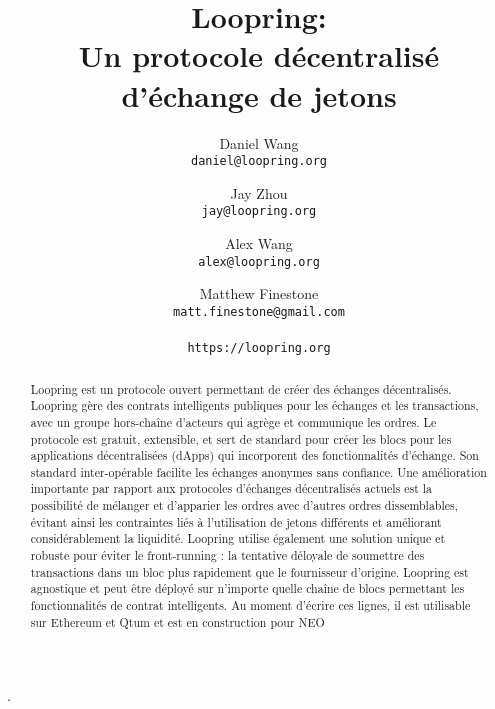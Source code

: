 \documentclass[UTF8,nofonts]{article}
\title{\textbf{Loopring:}\\\textbf{Un protocole décentralisé d'échange de jetons}}
\author{
  Daniel Wang\\
  \texttt{daniel@loopring.org}\\
  \and
  	Jay Zhou\\
  	\texttt{jay@loopring.org}\\
  	\and
  	Alex Wang\\
  	\texttt{alex@loopring.org}\\
  	\and
  	Matthew Finestone\\
  	\texttt{matt.finestone@gmail.com}\\ 
  \\
  \texttt{https://loopring.org}
 }
\begin{document}
\maketitle

\begin{abstract}
Loopring est un protocole ouvert permettant de créer des échanges décentralisés. Loopring gère des contrats intelligents publiques  pour les échanges et les transactions, avec un groupe hors-chaîne d’acteurs qui agrège et communique les ordres. Le protocole est gratuit, extensible, et sert de standard pour créer les blocs pour les applications décentralisées (dApps) qui incorporent des fonctionnalités d’échange. Son standard inter-opérable facilite les échanges anonymes sans confiance. Une amélioration importante par rapport aux protocoles d'échanges décentralisés actuels est la possibilité de mélanger et d'apparier les ordres avec d'autres ordres dissemblables, évitant ainsi les contraintes liés à l’utilisation de jetons différents et améliorant considérablement la liquidité. Loopring utilise également une solution unique et robuste pour éviter le front-running : la tentative déloyale de soumettre des transactions dans un bloc plus rapidement que le fournisseur d'origine. Loopring est agnostique et peut être déployé sur n'importe quelle chaîne de blocs permettant les fonctionnalités de contrat intelligents. Au moment d'écrire ces lignes, il est utilisable sur Ethereum  \cite{buterin2017ethereum} \cite{wood2014ethereum} et Qtum \cite{dai2017smart} et est en construction pour NEO \cite{atterlonn2018distributed}
\end{abstract}.
\end{document}
